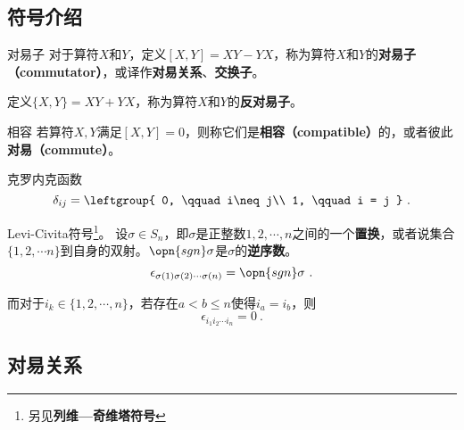 


\subsection{符号介绍}

\begin{definition}{对易子}\label{def_ComOpQ_13}
对于算符$X$和$Y$，定义$[X, Y]=XY-YX$，称为算符$X$和$Y$的\textbf{对易子（commutator）}，或译作\textbf{对易关系}、\textbf{交换子}。

定义$\{X, Y\}=XY+YX$，称为算符$X$和$Y$的\textbf{反对易子}。
\end{definition}


\begin{definition}{相容}\label{def_ComOpQ_17}
若算符$X, Y$满足$[X, Y]=0$，则称它们是\textbf{相容（compatible）}的，或者彼此\textbf{对易（commute）}。
\end{definition}



\begin{definition}{克罗内克函数}
\begin{equation}
\delta_{ij} = \leftgroup{
    0, \qquad i\neq j\\
    1, \qquad i = j
}~.
\end{equation}
\end{definition}




\begin{definition}{Levi-Civita符号\footnote{另见\textbf{列维—奇维塔符号}}。}
设$\sigma\in S_n$，即$\sigma$是正整数$1, 2, \cdots, n$之间的一个\textbf{置换}，或者说集合$\{1, 2, \cdots n\}$到自身的双射。$\opn{sgn}\sigma$是$\sigma$的\textbf{逆序数}。
\begin{equation}
\epsilon_{\sigma(1) \sigma(2) \cdots \sigma(n)}=\opn{sgn}\sigma~.
\end{equation}

而对于$i_k\in\{1, 2, \cdots, n\}$，若存在$a<b\leq n$使得$i_a=i_b$，则
\begin{equation}
\epsilon_{i_1 i_2 \cdots i_n} = 0~.
\end{equation}

\end{definition}


\subsection{对易关系}


